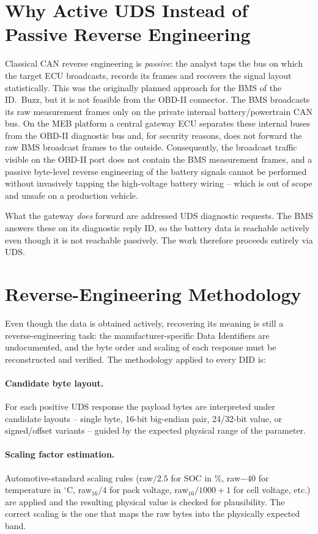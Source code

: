 \documentclass[11pt,a4paper,oneside,parskip=half]{scrreprt}
\begin{document}
\section{Why Active UDS Instead of Passive Reverse Engineering}
\label{sec:why_uds}
Classical CAN reverse engineering is \textit{passive}: the analyst taps the bus on which the target ECU broadcasts, records its frames and recovers the signal layout statistically. This was the originally planned approach for the BMS of the ID.~Buzz, but it is not feasible from the OBD-II connector. The BMS broadcasts its raw measurement frames only on the private internal battery/powertrain CAN bus. On the MEB platform a central gateway ECU separates these internal buses from the OBD-II diagnostic bus and, for security reasons, does not forward the raw BMS broadcast frames to the outside. Consequently, the broadcast traffic visible on the OBD-II port does not contain the BMS measurement frames, and a passive byte-level reverse engineering of the battery signals cannot be performed without invasively tapping the high-voltage battery wiring -- which is out of scope and unsafe on a production vehicle.

What the gateway \emph{does} forward are addressed UDS diagnostic requests. The BMS answers these on its diagnostic reply ID, so the battery data is reachable actively even though it is not reachable passively. The work therefore proceeds entirely via UDS.

\section{Reverse-Engineering Methodology}
\label{sec:re_methodology}
Even though the data is obtained actively, recovering its meaning is still a reverse-engineering task: the manufacturer-specific Data Identifiers are undocumented, and the byte order and scaling of each response must be reconstructed and verified. The methodology applied to every DID is:

\paragraph{Candidate byte layout.} For each positive UDS response the payload bytes are interpreted under candidate layouts -- single byte, 16-bit big-endian pair, 24/32-bit value, or signed/offset variants -- guided by the expected physical range of the parameter.

\paragraph{Scaling factor estimation.} Automotive-standard scaling rules (raw$/2.5$ for SOC in \%, raw$-40$ for temperature in $^\circ$C, raw$_{16}/4$ for pack voltage, raw$_{16}/1000+1$ for cell voltage, etc.) are applied and the resulting physical value is checked for plausibility. The correct scaling is the one that maps the raw bytes into the physically expected band.
\end{document}
